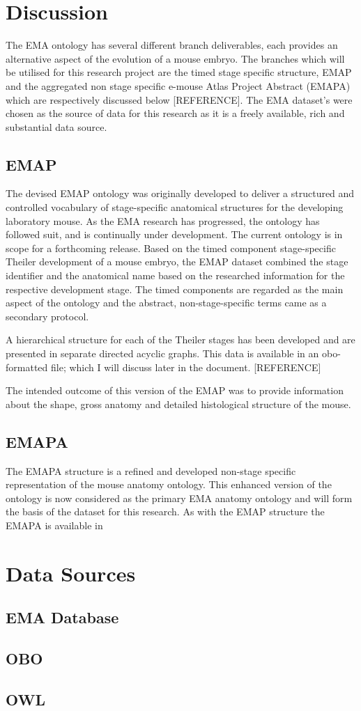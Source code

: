 \section{Discussion}
The EMA ontology has several different branch deliverables, each provides an alternative aspect of the evolution of a mouse embryo. The branches which will be utilised for this research project are the timed stage specific structure, EMAP and the aggregated non stage specific e-mouse Atlas Project Abstract (EMAPA) which are respectively discussed below [REFERENCE]. The EMA dataset's were chosen as the source of data for this research as it is a freely available, rich and substantial data source.

\subsection{EMAP}
The devised EMAP ontology was originally developed to deliver a structured and controlled vocabulary of stage-specific anatomical structures for the developing laboratory mouse. As the EMA research has progressed, the ontology has followed suit, and is continually under development. The current ontology is in scope for a forthcoming release.
Based on the timed component stage-specific Theiler development of a mouse embryo, the EMAP dataset combined the stage identifier and the anatomical name based on the researched information for the respective development stage. The timed components are regarded as the main aspect of the ontology and the abstract, non-stage-specific terms came as a secondary protocol.

A hierarchical structure for each of the Theiler stages has been developed and are presented in separate directed acyclic graphs. This data is available in an obo-formatted file; which I will discuss later in the document. [REFERENCE]

The intended outcome of this version of the EMAP was to provide information about the shape, gross anatomy and detailed histological structure of the mouse.

\subsection{EMAPA}
The EMAPA structure is a refined and developed non-stage specific representation of the mouse anatomy ontology. This enhanced version of the ontology is now considered as the primary EMA anatomy ontology and will form the basis of the dataset for this research. As with the EMAP structure the EMAPA is available in 

\section{Data Sources}
\subsection{EMA Database}
\subsection{OBO}
\subsection{OWL}
